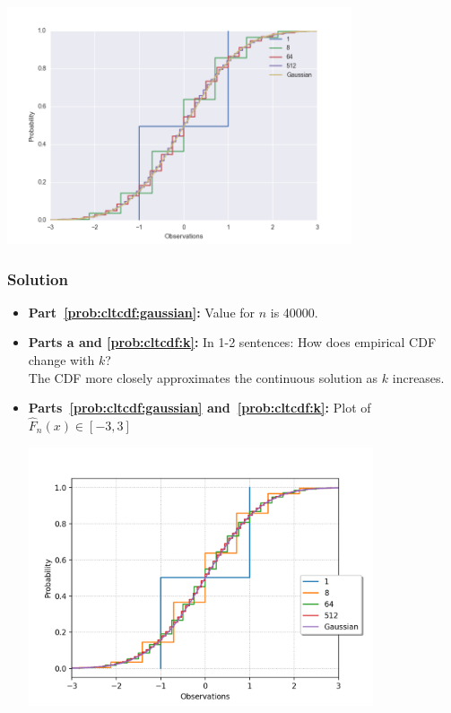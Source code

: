 \documentclass{article}
\begin{document}
\begin{aprob}
    \begin{center}
        \includegraphics[width=4in]{full.png}
    \end{center}

    \subsubsection*{Solution}
    \begin{itemize}
        \item \textbf{Part~\ref{prob:cltcdf:gaussian}:} Value for $n$  is 40000.
        \item \textbf{Parts a and \ref{prob:cltcdf:k}:} In 1-2 sentences: How does empirical CDF change with $k$?
        \\ The CDF more closely approximates the continuous solution as $k$ increases.
        \item \textbf{Parts~\ref{prob:cltcdf:gaussian} and~\ref{prob:cltcdf:k}:} Plot of $\widehat{F}_n(x) \in [-3, 3]$
        \begin{center}
            \includegraphics[width=4in]{Figure_2.png}
        \end{center}
    \end{itemize}
\end{aprob}
\end{document}
